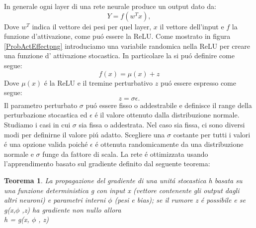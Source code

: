 \documentclass[a4paper,10pt]{article}
\begin{document}
 In generale ogni layer di una rete neurale produce un output dato da:
 \begin{equation} 
  Y = f\left(w^{T} x\right), 
 \end{equation} 
 Dove $w^{T}$ indica il vettore dei pesi per quel layer, $x$ il vettore dell'input e $f$ la funzione d'attivazione, come pu\'o  essere la ReLU. Come mostrato in figura \ref{ProbActEffectpng} introduciamo una variabile randomica nella ReLU per creare una funzione d' attivazione stocastica. In particolare la si pu\'o definire come segue:
 \begin{equation} 
  f\left(x\right) = \mu \left(x\right) + z
 \end{equation} 
 Dove $\mu\left(x\right)$ \'e la ReLU e il tremine perturbativo $z$ pu\'o essere espresso come segue:
 \begin{equation} 
  z = \sigma  \epsilon. 
 \end{equation} 
 Il parametro perturbato $\sigma$ pu\' o essere fisso o addestrabile e definisce il range della perturbazione stocastica ed $\epsilon$ \'e il valore ottenuto dalla distribuzione normale. Studiamo i casi in cui $\sigma$ sia fissa o addestrata. 
 Nel caso sia fissa, ci sono diversi modi per definirne il valore pi\'u adatto. Scegliere una $\sigma$ costante per tutti i valori \'e una opzione valida poich\'e $\epsilon$ \'e ottenuta randomicamente da una distribuzione normale e $\sigma$ funge da fattore di scala. La rete \'e ottimizzata usando l'apprendimento basato sul gradiente definito dal seguente teorema:
 \newtheorem{teorema}{Teorema}
 
 \begin{teorema} \label{GradienPropth}
  La propagazione del gradiente di una unit\'a stocastica h basata su una funzione deterministica g con input x (vettore contenente gli output dagli altri neuroni) e parametri interni $\phi$ (pesi e bias); se il rumore z \'e possibile e se g(x,$\phi$ ,z) ha gradiente non nullo allora\\
  
  \centering
  h = g(x, $\phi$ , z)
 \end{teorema}
\end{document}
